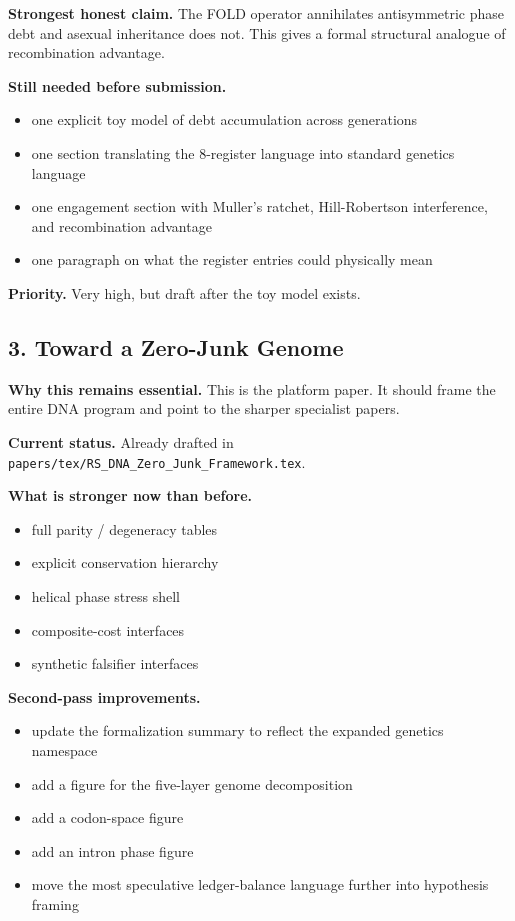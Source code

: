 \documentclass[11pt]{article}
\begin{document}
\textbf{Strongest honest claim.} The FOLD operator annihilates antisymmetric phase debt and asexual inheritance does not. This gives a formal structural analogue of recombination advantage.

\textbf{Still needed before submission.}
\begin{itemize}
\item one explicit toy model of debt accumulation across generations
\item one section translating the 8-register language into standard genetics language
\item one engagement section with Muller's ratchet, Hill-Robertson interference, and recombination advantage
\item one paragraph on what the register entries could physically mean
\end{itemize}

\textbf{Priority.} Very high, but draft after the toy model exists.

\subsection*{3. Toward a Zero-Junk Genome}
\textbf{Why this remains essential.} This is the platform paper. It should frame the entire DNA program and point to the sharper specialist papers.

\textbf{Current status.} Already drafted in \texttt{papers/tex/RS\_DNA\_Zero\_Junk\_Framework.tex}.

\textbf{What is stronger now than before.}
\begin{itemize}
\item full parity / degeneracy tables
\item explicit conservation hierarchy
\item helical phase stress shell
\item composite-cost interfaces
\item synthetic falsifier interfaces
\end{itemize}

\textbf{Second-pass improvements.}
\begin{itemize}
\item update the formalization summary to reflect the expanded genetics namespace
\item add a figure for the five-layer genome decomposition
\item add a codon-space figure
\item add an intron phase figure
\item move the most speculative ledger-balance language further into hypothesis framing
\end{itemize}
\end{document}

